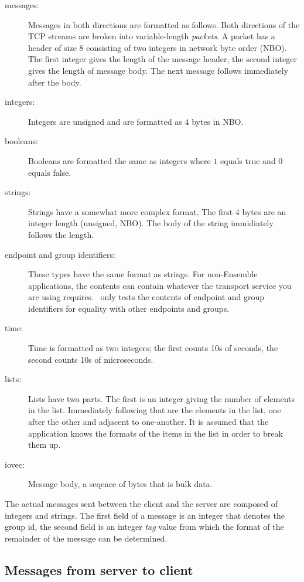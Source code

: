 \begin{description}
\item
[messages:] Messages in both directions are formatted as follows.
Both directions of the TCP streams are broken into variable-length
{\it packets}.  A packet has a header of size $8$ consisting of two
integers in network byte order (NBO). The first integer gives the
length of the message header, the second integer gives the length of
message body. The next message follows immediately after
the body.
\item
[integers:] Integers are unsigned and are formatted as $4$ bytes in
NBO.
\item
[booleans:] Booleans are formatted the same as integers where $1$ equals true and
$0$ equals false.
\item
[strings:] Strings have a somewhat more complex format.
The first $4$ bytes are an integer length (unsigned, NBO).  
The body of the string immidiately follows
the length.
\item
[endpoint and group identifiers:] These types have the same format as
strings.  For non-Ensemble applications, the contents can contain
whatever the transport service you are using requires.  \ensemble\
only tests the contents of endpoint and group identifiers for
equality with other endpoints and groups.
\item
[time:] Time is formatted as two integers; the first counts 10s of seconds, the
second counts 10s of microseconds.
\item
[lists:] Lists have two parts.  The first is an integer giving the
number of elements in the list.  Immediately following that are the
elements in the list, one after the other and adjacent to
one-another.  It is assumed that the application knows the formats of
the items in the list in order to break them up.
\item
[iovec:] Message body, a seqence of bytes that is bulk data.
\end{description}

The actual messages sent between the client and the server are
composed of integers and strings.  The first field of a message is an
integer that denotes the group id, the second field is an integer
\emph{tag} value from which the format of the remainder of the message
can be determined.


\subsection{Messages from server to client}

